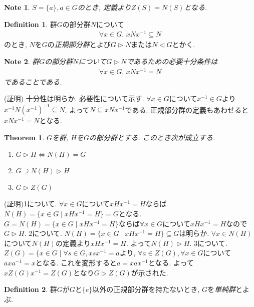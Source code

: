 \documentclass{article}
\theoremstyle{plain}
\newtheorem{theorem}{Theorem}
\theoremstyle{definition}
\newtheorem{definition}{Definition}
\theoremstyle{plain}
\newtheorem{note}{Note}
\numberwithin{equation}{section}
\numberwithin{theorem}{section}
\numberwithin{definition}{section}
\numberwithin{note}{section}
\begin{document}
\begin{note}
     $S=\lbrace a\rbrace,  a \in G$のとき, 定義より$Z(S)=N(S)$となる.
\end{note}
\begin{definition}
     群$G$の部分群$N$について
     \begin{align}
          \forall x \in G,\, xNx^{-1}\subseteq N
     \end{align}
     のとき, $N$を$G$の\emph{正規部分群}とよび$G\rhd N$または$N \lhd G$とかく.
\end{definition}
\begin{note}
     群$G$の部分群$N$について$G\rhd N$であるための必要十分条件は
     \begin{align}
          \forall x \in G,\, xNx^{-1}=N
     \end{align}
     であることである.
\end{note}
(証明) 十分性は明らか. 必要性について示す.
$\forall x \in G$について$x^{-1}\in G$より$x^{-1}N(x^{-1})^{-1}\subseteq N$. よって$N\subseteq xNx^{-1}$である. 正規部分群の定義もあわせると$xNx^{-1}=N$となる.
\begin{theorem}
     $G$を群, $H$を$G$の部分群とする. このとき次が成立する.
     \begin{enumerate}
          \item $G\rhd H\Leftrightarrow N(H)=G$
          \item $G\supseteq N(H)\rhd H$
          \item $G\rhd Z(G)$
     \end{enumerate}
\end{theorem}
(証明)1について. $\forall x \in G$について$xHx^{-1}=H$ならば$N(H)=\lbrace x\in G\mid xHx^{-1}=H\rbrace=G$となる. $G=N(H)=\lbrace x\in G\mid xHx^{-1}=H\rbrace$ならば$\forall x\in G$について$xHx^{-1}=H$なので$G\rhd H$.
2について. $N(H)=\lbrace x\in G\mid xHx^{-1}=H\rbrace \subseteq G$は明らか. $\forall x \in N(H)$について$N(H)$の定義より$xHx^{-1}=H$. よって$N(H)\rhd H$.
3について. $Z(G)=\lbrace x\in G\mid \forall s\in G, xsx^{-1}=a$より, $\forall a\in Z(G),\forall x \in G$について$axa^{-1}=x$となる. これを変形すると$a=xax^{-1}$となる. よって$xZ(G)x^{-1}=Z(G)$となり$G\rhd Z(G)$が示された.
\begin{definition}
     群$G$が$G$と$\lbrace e\rbrace$以外の正規部分群を持たないとき, $G$を\emph{単純群}とよぶ.
\end{definition}
\end{document}
